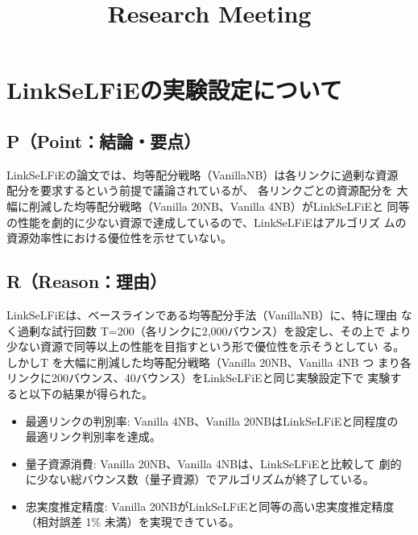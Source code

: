 \documentclass[conference]{IEEEtran}
\begin{document}
\title{Research Meeting}

\author{
}

\maketitle


\section{LinkSeLFiEの実験設定について}
\label{sec:org8b376ec}
\subsection{P（Point：結論・要点）}
\label{sec:org29df353}
LinkSeLFiEの論文では、均等配分戦略（VanillaNB）は各リンクに過剰な資源
配分を要求するという前提で議論されているが、 各リンクごとの資源配分を
大幅に削減した均等配分戦略（Vanilla 20NB、Vanilla 4NB）がLinkSeLFiEと
同等の性能を劇的に少ない資源で達成しているので、LinkSeLFiEはアルゴリズ
ムの資源効率性における優位性を示せていない。

\subsection{R（Reason：理由）}
\label{sec:org49b5deb}
LinkSeLFiEは、ベースラインである均等配分手法（VanillaNB）に、特に理由
なく過剰な試行回数 T=200（各リンクに2,000バウンス）を設定し、その上で
より少ない資源で同等以上の性能を目指すという形で優位性を示そうとしてい
る。しかしT を大幅に削減した均等配分戦略（Vanilla 20NB、Vanilla 4NB つ
まり各リンクに200バウンス、40バウンス）をLinkSeLFiEと同じ実験設定下で
実験すると以下の結果が得られた。

\begin{itemize}
\item 最適リンクの判別率: Vanilla 4NB、Vanilla 20NBはLinkSeLFiEと同程度の
最適リンク判別率を達成。

\item 量子資源消費: Vanilla 20NB、Vanilla 4NBは、LinkSeLFiEと比較して
劇的に少ない総バウンス数（量子資源）でアルゴリズムが終了している。

\item 忠実度推定精度: Vanilla 20NBがLinkSeLFiEと同等の高い忠実度推定精度
（相対誤差 1\% 未満）を実現できている。
\end{itemize}
\end{document}

